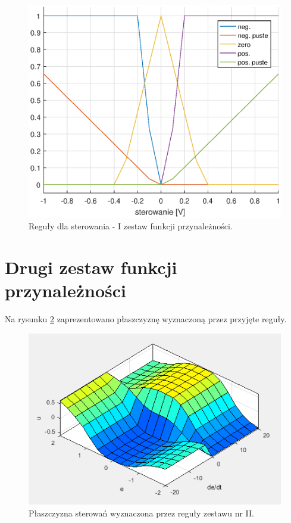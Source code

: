 \begin{figure}[h!]
	\centering
	\includegraphics[scale = 0.65]{fig/u_rules.eps}
	\caption		
	{Reguły dla sterowania -  I zestaw funkcji przynależności.}
	\label{u_rules1}
\end{figure}

\FloatBarrier
\section{Drugi zestaw funkcji przynależności}
\label{mamdani2}
Na rysunku \ref{set2_surface} zaprezentowano płaszczyznę wyznaczoną przez przyjęte reguły.
\begin{figure}[h!]
	\centering
	\includegraphics[scale = 0.8]{fig/fuzzySurface.PNG}
	\caption		
	{Płaszczyzna sterowań wyznaczona przez reguły zestawu nr II.}
	\label{set2_surface}
\end{figure}

